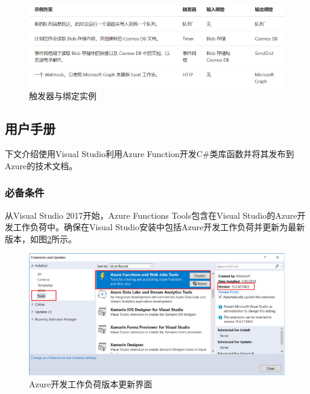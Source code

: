 \documentclass[11pt]{article}
\begin{document}
\begin{figure}[!htbp]
	\centering
	\includegraphics[scale=0.6]{figs/1.png}
	\caption{触发器与绑定实例}
	\label{fig1}	
\end{figure}

\subsection{用户手册}
下文介绍使用Visual Studio利用Azure Function开发C\#类库函数并将其发布到 Azure的技术文档。

\subsubsection{必备条件} 
从Visual Studio 2017开始，Azure Functions Tools包含在Visual Studio的Azure开发工作负荷中。确保在Visual Studio安装中包括Azure开发工作负荷并更新为最新版本，如图\ref{fig2}所示。
\begin{figure}[!htbp]	
	\centering
	\includegraphics[scale=0.6]{figs/2.png}
	\caption{Azure开发工作负荷版本更新界面}
	\label{fig2}	
\end{figure}
\end{document}

